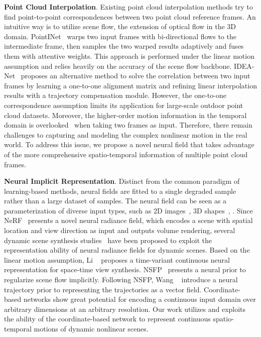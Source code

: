\documentclass[10pt,twocolumn,letterpaper]{article}
\begin{document}
\textbf{Point Cloud Interpolation}. Existing point cloud interpolation methods try to find point-to-point correspondences between two point cloud reference frames. An intuitive way is to utilize scene flow, the extension of optical flow in the 3D domain. PointINet~\cite{lu2021pointinet} warps two input frames with bi-directional flows to the intermediate frame, then samples the two warped results adaptively and fuses them with attentive weights. This approach is performed under the linear motion assumption and relies heavily on the accuracy of the scene flow backbone. IDEA-Net~\cite{zeng2022idea} proposes an alternative method to solve the correlation between two input frames by learning a one-to-one alignment matrix and refining linear interpolation results with a trajectory compensation module. However, the one-to-one correspondence assumption limits its application for large-scale outdoor point cloud datasets. Moreover, the higher-order motion information in the temporal domain is overlooked~\cite{dutta2022non} when taking two frames as input. Therefore, there remain challenges to capturing and modeling the complex nonlinear motion in the real world. To address this issue, we propose a novel neural field that takes advantage of the more comprehensive spatio-temporal information of multiple point cloud frames.



\textbf{Neural Implicit Representation}. Distinct from the common paradigm of learning-based methods, neural fields are fitted to a single degraded sample rather than a large dataset of samples. The neural field can be seen as a parameterization of diverse input types, such as 2D images~\cite{chen2019net, karras2021alias}, 3D shapes~\cite{mescheder2019occupancy, park2019deepsdf}, \etc. Since NeRF~\cite{mildenhall2021nerf} presents a novel neural radiance field, which encodes a scene with spatial location and view direction as input and outputs volume rendering, several dynamic scene synthesis studies~\cite{du2021neural, gao2021dynamic, li2021neuralSF, park2021nerfies, pumarola2021d, tretschk2021non, xian2021space, li2021neural} have been proposed to exploit the representation ability of neural radiance fields for dynamic scenes. Based on the linear motion assumption, Li \etal~\cite{li2021neural} proposes a time-variant continuous neural representation for space-time view synthesis. NSFP~\cite{li2021neuralSF} presents a neural prior to regularize scene flow implicitly. Following NSFP, Wang \etal~\cite{wang2022neural} introduce a neural trajectory prior to representing the trajectories as a vector field. Coordinate-based networks show great potential for encoding a continuous input domain over arbitrary dimensions at an arbitrary resolution. Our work utilizes and exploits the ability of the coordinate-based network to represent continuous spatio-temporal motions of dynamic nonlinear scenes.
\end{document}
